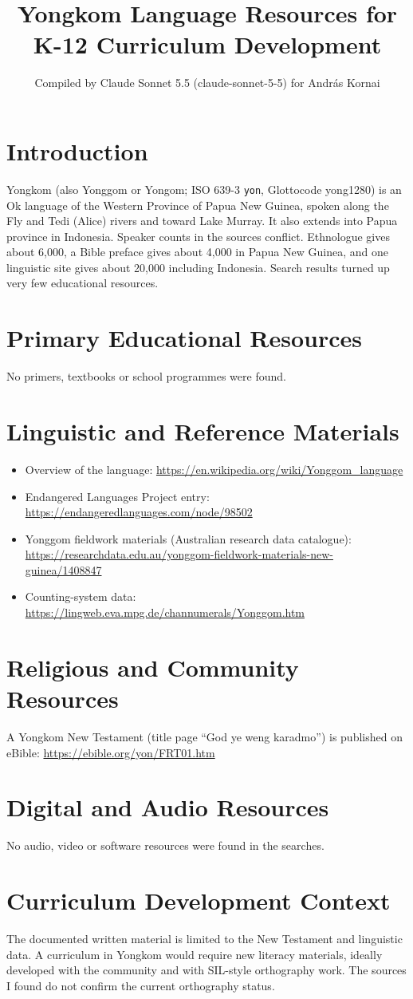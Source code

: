 \documentclass[12pt]{article}
\title{Yongkom Language Resources for K-12 Curriculum Development}
\author{Compiled by Claude Sonnet 5.5 (claude-sonnet-5-5) for Andr\'as Kornai}
\date{}
\begin{document}
\maketitle

\section{Introduction}
Yongkom (also Yonggom or Yongom; ISO 639-3 \texttt{yon}, Glottocode yong1280) is an Ok language of the Western Province of Papua New Guinea, spoken along the Fly and Tedi (Alice) rivers and toward Lake Murray. It also extends into Papua province in Indonesia. Speaker counts in the sources conflict. Ethnologue gives about 6,000, a Bible preface gives about 4,000 in Papua New Guinea, and one linguistic site gives about 20,000 including Indonesia. Search results turned up very few educational resources.

\section{Primary Educational Resources}
No primers, textbooks or school programmes were found.

\section{Linguistic and Reference Materials}
\begin{itemize}
\item Overview of the language: \url{https://en.wikipedia.org/wiki/Yonggom_language}
\item Endangered Languages Project entry: \url{https://endangeredlanguages.com/node/98502}
\item Yonggom fieldwork materials (Australian research data catalogue): \url{https://researchdata.edu.au/yonggom-fieldwork-materials-new-guinea/1408847}
\item Counting-system data: \url{https://lingweb.eva.mpg.de/channumerals/Yonggom.htm}
\end{itemize}

\section{Religious and Community Resources}
A Yongkom New Testament (title page ``God ye weng karadmo'') is published on eBible: \url{https://ebible.org/yon/FRT01.htm}

\section{Digital and Audio Resources}
No audio, video or software resources were found in the searches.

\section{Curriculum Development Context}
The documented written material is limited to the New Testament and linguistic data. A curriculum in Yongkom would require new literacy materials, ideally developed with the community and with SIL-style orthography work. The sources I found do not confirm the current orthography status.
\end{document}
